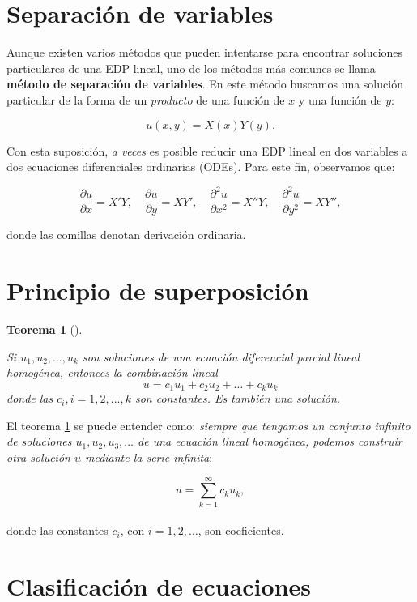\documentclass[
  spanish,
  us-letterpaper,
  DIV=11,
  numbers=noendperiod]{scrreprt}
\theoremstyle{plain}
\newtheorem{theorem}{Teorema}[chapter]
\theoremstyle{definition}
\theoremstyle{remark}
\begin{document}
\section{Separación de variables}\label{separaciuxf3n-de-variables}

Aunque existen varios métodos que pueden intentarse para encontrar
soluciones particulares de una EDP lineal, uno de los métodos más
comunes se llama \textbf{método de separación de variables}. En este
método buscamos una solución particular de la forma de un
\emph{producto} de una función de \(x\) y una función de \(y\):

\[
u(x, y) = X(x)Y(y).
\]

Con esta suposición, \emph{a veces} es posible reducir una EDP lineal en
dos variables a dos ecuaciones diferenciales ordinarias (ODEs). Para
este fin, observamos que:

\[
\dfrac{\partial u}{\partial x} = X'Y, \quad
\dfrac{\partial u}{\partial y} = XY', \quad
\dfrac{\partial^2 u}{\partial x^2} = X''Y, \quad
\dfrac{\partial^2 u}{\partial y^2} = XY'',
\]

donde las comillas denotan derivación ordinaria.

\section{Principio de
superposición}\label{principio-de-superposiciuxf3n}

\begin{theorem}[]\protect\hypertarget{thm-superposition}{}\label{thm-superposition}

Si \(u_1 , u_2 , \dots , u_k\) son soluciones de una ecuación
diferencial parcial lineal homogénea, entonces la combinación lineal \[
u = c_1u_1 + c_2u_2 + \dots + c_ku_k
\] donde las \(c_i, i=1,2,\dots,k\) son constantes. Es también una
solución.

\end{theorem}

El teorema \ref{thm-superposition} se puede entender como: \emph{siempre
que tengamos un conjunto infinito de soluciones
\(u_1, u_2, u_3, \ldots\) de una ecuación lineal homogénea, podemos
construir otra solución \(u\) mediante la serie infinita}:

\[  
u = \sum_{k=1}^{\infty} c_k u_k,  
\]\\
donde las constantes \(c_i\), con \(i = 1, 2, \ldots\), son
coeficientes.

\section{Clasificación de
ecuaciones}\label{clasificaciuxf3n-de-ecuaciones}
\end{document}
